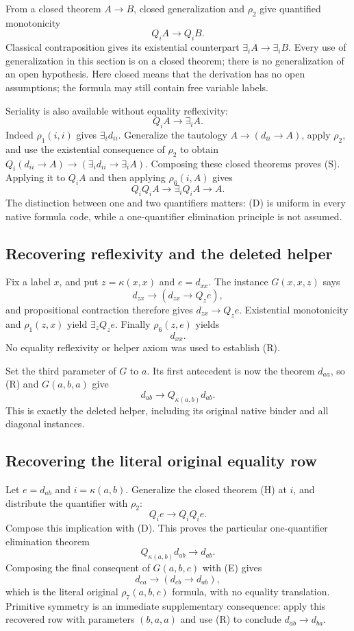 From a closed theorem $A\to B$, closed generalization and $\rho_2$ give
quantified monotonicity
\[
 Q_iA\longrightarrow Q_iB.
\]
Classical contraposition gives its existential counterpart
$\exists_iA\to\exists_iB$.  Every use of generalization in this section
is on a closed theorem; there is no generalization of an open hypothesis.
Here closed means that the derivation has no open assumptions; the formula
may still contain free variable labels.

Seriality is also available without equality reflexivity:
\[
 Q_iA\longrightarrow\exists_iA.                                \tag{S}
\]
Indeed $\rho_1(i,i)$ gives $\exists_i d_{ii}$.  Generalize the tautology
$A\to(d_{ii}\to A)$, apply $\rho_2$, and use the existential consequence
of $\rho_2$ to obtain
$Q_i(d_{ii}\to A)\to(\exists_i d_{ii}\to\exists_iA)$.
Composing these closed theorems proves (S).
Applying it to $Q_iA$ and then applying $\rho_6(i,A)$ gives
\[
 Q_iQ_iA\longrightarrow\exists_iQ_iA\longrightarrow A.          \tag{D}
\]
The distinction between one and two quantifiers matters: (D) is uniform
in every native formula code, while a one-quantifier elimination principle
is not assumed.

\subsection{Recovering reflexivity and the deleted helper}

Fix a label $x$, and put $z=\kappa(x,x)$ and $e=d_{xx}$.  The instance
$G(x,x,z)$ says
\[
 d_{zx}\longrightarrow(d_{zx}\longrightarrow Q_ze),
\]
and propositional contraction therefore gives
$d_{zx}\to Q_ze$.  Existential monotonicity and $\rho_1(z,x)$ yield
$\exists_zQ_ze$.  Finally $\rho_6(z,e)$ yields
\[
 d_{xx}.                                                       \tag{R}
\]
No equality reflexivity or helper axiom was used to establish (R).

Set the third parameter of $G$ to $a$.  Its first antecedent is now the
theorem $d_{aa}$, so (R) and $G(a,b,a)$ give
\[
 d_{ab}\longrightarrow Q_{\kappa(a,b)}d_{ab}.                   \tag{H}
\]
This is exactly the deleted helper, including its original native binder
and all diagonal instances.

\subsection{Recovering the literal original equality row}

Let $e=d_{ab}$ and $i=\kappa(a,b)$.  Generalize the closed theorem (H)
at $i$, and distribute the quantifier with $\rho_2$:
\[
 Q_ie\longrightarrow Q_iQ_ie.
\]
Compose this implication with (D).  This proves the particular
one-quantifier elimination theorem
\[
 Q_{\kappa(a,b)}d_{ab}\longrightarrow d_{ab}.                   \tag{E}
\]
Composing the final consequent of $G(a,b,c)$ with (E) gives
\[
 d_{ca}\longrightarrow(d_{cb}\longrightarrow d_{ab}),
\]
which is the literal original $\rho_7(a,b,c)$ formula, with no equality
translation.  Primitive symmetry is an immediate supplementary
consequence: apply this recovered row with parameters $(b,a,a)$ and use
(R) to conclude $d_{ab}\to d_{ba}$.

